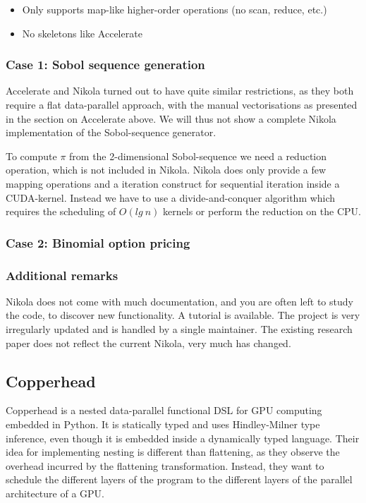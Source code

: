 \documentclass[preprint]{sigplanconf}
\begin{document}
 \begin{itemize}
 \item Only supports map-like higher-order operations (no scan,
   reduce, etc.)
 \item No skeletons like Accelerate
 \end{itemize}

\subsubsection{Case 1: Sobol sequence generation}
Accelerate and Nikola turned out to have quite similar restrictions,
as they both require a flat data-parallel approach, with the manual
vectorisations as presented in the section on Accelerate above.
We will thus not show a complete Nikola implementation of the
Sobol-sequence generator.

To compute $\pi$ from the 2-dimensional Sobol-sequence we need
a reduction operation, which is not included in Nikola. Nikola does
only provide a few mapping operations and a iteration construct for
sequential iteration inside a CUDA-kernel. Instead we have to use a
divide-and-conquer algorithm which requires the scheduling of
$O(lg~n)$ kernels or perform the reduction on the CPU.

\subsubsection{Case 2: Binomial option pricing}

\subsubsection{Additional remarks} Nikola does not come with much
documentation, and you are often left to study the code, to discover
new functionality. A tutorial is available. The project is very
irregularly updated and is handled by a single maintainer. The
existing research paper does not reflect the current Nikola, very much
has changed.

\subsection{Copperhead}
Copperhead is a nested data-parallel functional DSL for GPU computing
embedded in Python. It is statically typed and uses Hindley-Milner
type inference, even though it is embedded inside a dynamically typed
language. Their idea for implementing nesting is different than
flattening, as they observe the overhead incurred by the flattening
transformation. Instead, they want to schedule the different layers of
the program to the different layers of the parallel architecture of a
GPU.
\end{document}
